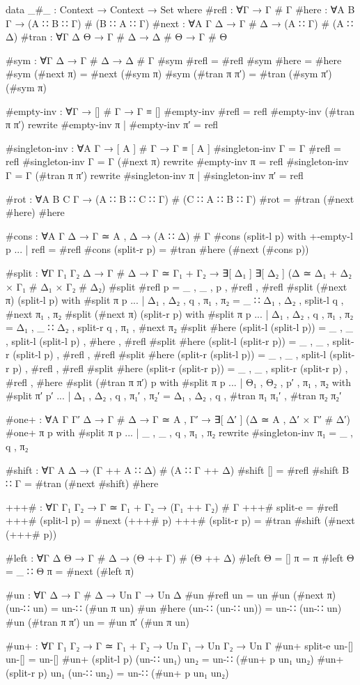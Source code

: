 \begin{code}
data _#_ : Context → Context → Set where
  #refl  : ∀{Γ} → Γ # Γ
  #here  : ∀{A B Γ} → (A ∷ B ∷ Γ) # (B ∷ A ∷ Γ)
  #next  : ∀{A Γ Δ} → Γ # Δ → (A ∷ Γ) # (A ∷ Δ)
  #tran  : ∀{Γ Δ Θ} → Γ # Δ → Δ # Θ → Γ # Θ

#sym : ∀{Γ Δ} → Γ # Δ → Δ # Γ
#sym #refl = #refl
#sym #here = #here
#sym (#next π) = #next (#sym π)
#sym (#tran π π′) = #tran (#sym π′) (#sym π)

#empty-inv : ∀{Γ} → [] # Γ → Γ ≡ []
#empty-inv #refl = refl
#empty-inv (#tran π π′) rewrite #empty-inv π | #empty-inv π′ = refl

#singleton-inv : ∀{A Γ} → [ A ] # Γ → Γ ≡ [ A ]
#singleton-inv {Γ = Γ} #refl = refl
#singleton-inv {Γ = Γ} (#next π) rewrite #empty-inv π = refl
#singleton-inv {Γ = Γ} (#tran π π′) rewrite #singleton-inv π | #singleton-inv π′ = refl

#rot : ∀{A B C Γ} → (A ∷ B ∷ C ∷ Γ) # (C ∷ A ∷ B ∷ Γ)
#rot = #tran (#next #here) #here

#cons : ∀{A Γ Δ} → Γ ≃ A , Δ → (A ∷ Δ) # Γ
#cons (split-l p) with +-empty-l p
... | refl = #refl
#cons (split-r p) = #tran #here (#next (#cons p))

#split : ∀{Γ Γ₁ Γ₂ Δ} → Γ # Δ → Γ ≃ Γ₁ + Γ₂ → ∃[ Δ₁ ] ∃[ Δ₂ ] (Δ ≃ Δ₁ + Δ₂ × Γ₁ # Δ₁ × Γ₂ # Δ₂)
#split #refl p = _ , _ , p , #refl , #refl
#split (#next π) (split-l p) with #split π p
... | Δ₁ , Δ₂ , q , π₁ , π₂ = _ ∷ Δ₁ , Δ₂ , split-l q , #next π₁ , π₂
#split (#next π) (split-r p) with #split π p
... | Δ₁ , Δ₂ , q , π₁ , π₂ = Δ₁ , _ ∷ Δ₂ , split-r q , π₁ , #next π₂
#split #here (split-l (split-l p)) = _ , _ , split-l (split-l p) , #here , #refl
#split #here (split-l (split-r p)) = _ , _ , split-r (split-l p) , #refl , #refl
#split #here (split-r (split-l p)) = _ , _ , split-l (split-r p) , #refl , #refl
#split #here (split-r (split-r p)) = _ , _ , split-r (split-r p) , #refl , #here
#split (#tran π π′) p with #split π p
... | Θ₁ , Θ₂ , p′ , π₁ , π₂ with #split π′ p′
... | Δ₁ , Δ₂ , q , π₁′ , π₂′ = Δ₁ , Δ₂ , q , #tran π₁ π₁′ , #tran π₂ π₂′

#one+ : ∀{A Γ Γ′ Δ} → Γ # Δ → Γ ≃ A , Γ′ → ∃[ Δ′ ] (Δ ≃ A , Δ′ × Γ′ # Δ′)
#one+ π p with #split π p
... | _ , _ , q , π₁ , π₂ rewrite #singleton-inv π₁ = _ , q , π₂

#shift : ∀{Γ A Δ} → (Γ ++ A ∷ Δ) # (A ∷ Γ ++ Δ)
#shift {[]} = #refl
#shift {B ∷ Γ} = #tran (#next #shift) #here

+++# : ∀{Γ Γ₁ Γ₂} → Γ ≃ Γ₁ + Γ₂ → (Γ₁ ++ Γ₂) # Γ
+++# split-e = #refl
+++# (split-l p) = #next (+++# p)
+++# (split-r p) = #tran #shift (#next (+++# p))

#left : ∀{Γ Δ Θ} → Γ # Δ → (Θ ++ Γ) # (Θ ++ Δ)
#left {Θ = []} π = π
#left {Θ = _ ∷ Θ} π = #next (#left π)

#un : ∀{Γ Δ} → Γ # Δ → Un Γ → Un Δ
#un #refl un = un
#un (#next π) (un-∷ un) = un-∷ (#un π un)
#un #here (un-∷ (un-∷ un)) = un-∷ (un-∷ un)
#un (#tran π π′) un = #un π′ (#un π un)

#un+ : ∀{Γ Γ₁ Γ₂} → Γ ≃ Γ₁ + Γ₂ → Un Γ₁ → Un Γ₂ → Un Γ
#un+ split-e un-[] un-[] = un-[]
#un+ (split-l p) (un-∷ un₁) un₂ = un-∷ (#un+ p un₁ un₂)
#un+ (split-r p) un₁ (un-∷ un₂) = un-∷ (#un+ p un₁ un₂)
\end{code}

